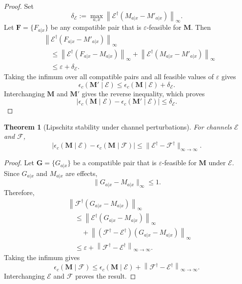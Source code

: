 \documentclass[
aps,pra,twocolumn,10pt,
superscriptaddress,longbibliography,floatfix
]{revtex4-2}
\newtheorem{theorem}{Theorem}[section]
\begin{document}
\begin{proof}
Set
\[
\delta_{\mathcal E}
:=
\max_{a,x}
\left\|
\mathcal E^\dagger(M_{a|x}-M'_{a|x})
\right\|_\infty.
\]
Let $\mathbf F=\{F_{a|x}\}$ be any compatible pair that is $\varepsilon$-feasible for $\mathbf M$. Then
\begin{align*}
&
\left\|
\mathcal E^\dagger(F_{a|x}-M'_{a|x})
\right\|_\infty
\\
&\quad\le
\left\|
\mathcal E^\dagger(F_{a|x}-M_{a|x})
\right\|_\infty
+
\left\|
\mathcal E^\dagger(M_{a|x}-M'_{a|x})
\right\|_\infty
\\
&\quad\le
\varepsilon+\delta_{\mathcal E}.
\end{align*}
Taking the infimum over all compatible pairs and all feasible values of $\varepsilon$ gives
\[
\epsilon_c(\mathbf M'\mid\mathcal E)
\le
\epsilon_c(\mathbf M\mid\mathcal E)
+
\delta_{\mathcal E}.
\]
Interchanging $\mathbf M$ and $\mathbf M'$ gives the reverse inequality,
which proves
\[
\left|
\epsilon_c(\mathbf M\mid\mathcal E)
-
\epsilon_c(\mathbf M'\mid\mathcal E)
\right|
\le
\delta_{\mathcal E}.
\]
\end{proof}

\begin{theorem}[Lipschitz stability under channel perturbations]
For channels $\mathcal E$ and $\mathcal F$,
\[
\left|\epsilon_c(\mathbf M\mid\mathcal E)-\epsilon_c(\mathbf M\mid\mathcal F)\right|
\le
\|\mathcal E^\dagger-\mathcal F^\dagger\|_{\infty\to\infty}.
\]
\end{theorem}

\begin{proof}
Let $\mathbf G=\{G_{a|x}\}$ be a compatible pair that is $\varepsilon$-feasible for $\mathbf M$ under $\mathcal E$. Since $G_{a|x}$ and $M_{a|x}$ are effects,
\[
\|G_{a|x}-M_{a|x}\|_\infty\le1.
\]
Therefore,
\begin{align*}
&
\left\|
\mathcal F^\dagger(G_{a|x}-M_{a|x})
\right\|_\infty
\\
&\quad\le
\left\|
\mathcal E^\dagger(G_{a|x}-M_{a|x})
\right\|_\infty
\\
&\qquad+
\left\|
(\mathcal F^\dagger-\mathcal E^\dagger)
(G_{a|x}-M_{a|x})
\right\|_\infty
\\
&\quad\le
\varepsilon+
\left\|
\mathcal F^\dagger-\mathcal E^\dagger
\right\|_{\infty\to\infty}.
\end{align*}
Taking the infimum gives
\[
\epsilon_c(\mathbf M\mid\mathcal F)
\le
\epsilon_c(\mathbf M\mid\mathcal E)
+
\left\|
\mathcal F^\dagger-\mathcal E^\dagger
\right\|_{\infty\to\infty}.
\]
Interchanging $\mathcal E$ and $\mathcal F$ proves the result.
\end{proof}
\end{document}
